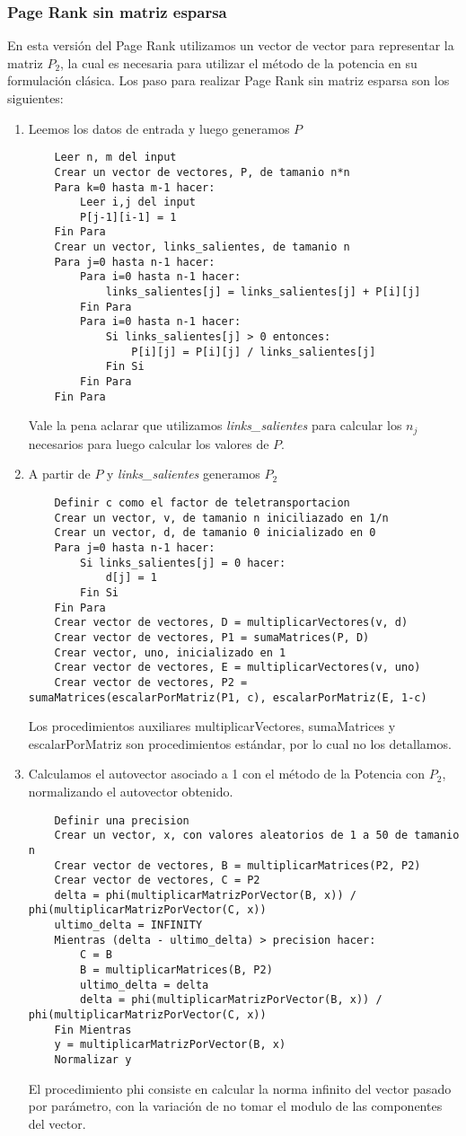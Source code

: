 \subsubsection{Page Rank sin matriz esparsa}
En esta versión del Page Rank utilizamos un vector de vector para representar la matriz $P_2$, la cual es necesaria para utilizar el método de la potencia en su formulación clásica.
Los paso para realizar Page Rank sin matriz esparsa son los siguientes:
\begin{enumerate}
	\item Leemos los datos de entrada y luego generamos $P$
	\begin{lstlisting}
	Leer n, m del input
	Crear un vector de vectores, P, de tamanio n*n
	Para k=0 hasta m-1 hacer:
		Leer i,j del input
		P[j-1][i-1] = 1
	Fin Para
	Crear un vector, links_salientes, de tamanio n
	Para j=0 hasta n-1 hacer:
		Para i=0 hasta n-1 hacer:
			links_salientes[j] = links_salientes[j] + P[i][j]
		Fin Para
		Para i=0 hasta n-1 hacer:
			Si links_salientes[j] > 0 entonces:
				P[i][j] = P[i][j] / links_salientes[j]
			Fin Si
		Fin Para
	Fin Para
	\end{lstlisting}
	Vale la pena aclarar que utilizamos \textit{links_salientes} para calcular los $n_j$ necesarios para luego calcular los valores de $P$.
	\item A partir de $P$ y \textit{links_salientes} generamos $P_2$
	\begin{lstlisting}
	Definir c como el factor de teletransportacion
	Crear un vector, v, de tamanio n iniciliazado en 1/n
	Crear un vector, d, de tamanio 0 inicializado en 0
	Para j=0 hasta n-1 hacer:
		Si links_salientes[j] = 0 hacer:
			d[j] = 1
		Fin Si
	Fin Para
	Crear vector de vectores, D = multiplicarVectores(v, d)
	Crear vector de vectores, P1 = sumaMatrices(P, D)
	Crear vector, uno, inicializado en 1
	Crear vector de vectores, E = multiplicarVectores(v, uno)
	Crear vector de vectores, P2 = sumaMatrices(escalarPorMatriz(P1, c), escalarPorMatriz(E, 1-c)
	\end{lstlisting}
	Los procedimientos auxiliares multiplicarVectores, sumaMatrices y escalarPorMatriz son procedimientos estándar, por lo cual no los detallamos.
	\item Calculamos el autovector asociado a 1 con el método de la Potencia con $P_2$, normalizando el autovector obtenido.
	\begin{lstlisting}
	Definir una precision
	Crear un vector, x, con valores aleatorios de 1 a 50 de tamanio n
	Crear vector de vectores, B = multiplicarMatrices(P2, P2)
	Crear vector de vectores, C = P2
	delta = phi(multiplicarMatrizPorVector(B, x)) / phi(multiplicarMatrizPorVector(C, x))
	ultimo_delta = INFINITY
	Mientras (delta - ultimo_delta) > precision hacer:
		C = B
		B = multiplicarMatrices(B, P2)
		ultimo_delta = delta
		delta = phi(multiplicarMatrizPorVector(B, x)) / phi(multiplicarMatrizPorVector(C, x))
	Fin Mientras
	y = multiplicarMatrizPorVector(B, x)
	Normalizar y
	\end{lstlisting}
	El procedimiento phi consiste en calcular la norma infinito del vector pasado por parámetro, con la variación de no tomar el modulo de las componentes del vector.


\end{enumerate}
